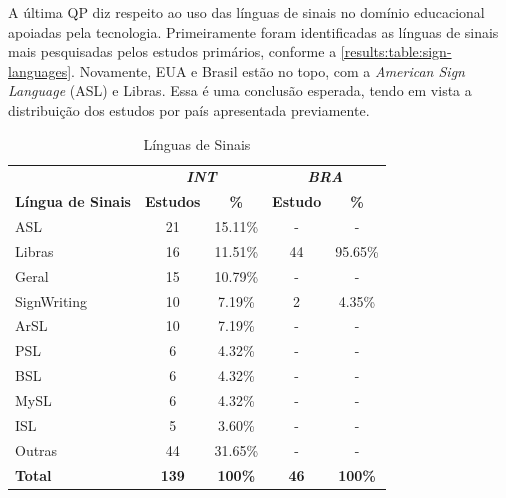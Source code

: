 A última QP diz respeito ao uso das línguas de sinais no domínio educacional apoiadas pela tecnologia. Primeiramente foram identificadas as línguas de sinais mais pesquisadas pelos estudos primários, conforme a \autoref{results:table:sign-languages}. Novamente, EUA e Brasil estão no topo, com a \textit{American Sign Language} (ASL) e Libras. Essa é uma conclusão esperada, tendo em vista a distribuição dos estudos por país apresentada previamente.

\begin{table}[htbp]
\caption{Línguas de Sinais}
\label{results:table:sign-languages}
\centering
\begin{tabular}{lcccc}
\hline
           & \multicolumn{2}{c}{\textbf{\textit{INT}}} & \multicolumn{2}{c}{\textbf{\textit{BRA}}}  \\ \cline{2-5}

\textbf{Língua de Sinais} & \textbf{Estudos} & \textbf{\%}             & \textbf{Estudo} & \textbf{\%}               \\ \hline
ASL                       & 21               & 15.11\%                 & -               & -                         \\ 
Libras                    & 16               & 11.51\%                 & 44              & 95.65\%                   \\ 
Geral                     & 15               & 10.79\%                 & -               & -                         \\ 
SignWriting               & 10               & 7.19\%                  & 2               & 4.35\%                    \\ 
ArSL                      & 10               & 7.19\%                  & -               & -                         \\ 
PSL                       & 6                & 4.32\%                  & -               & -                         \\ 
BSL                       & 6                & 4.32\%                  & -               & -                         \\ 
MySL                      & 6                & 4.32\%                  & -               & -                         \\ 
ISL                       & 5                & 3.60\%                  & -               & -                         \\ 
Outras                    & 44               & 31.65\%                 & -               & -                         \\ 
\textbf{Total}            & \textbf{139}     & \textbf{100\%}          & \textbf{46}     & \textbf{100\%}            \\ \hline
\end{tabular}
\fautor
\end{table}

